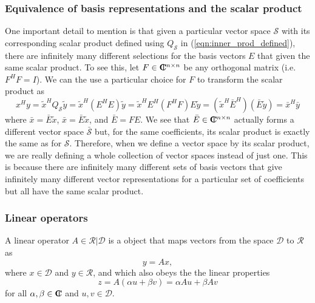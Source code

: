 \subsubsection{Equivalence of basis representations and the scalar product}

One important detail to mention is that given a particular vector space
$\mathcal{S}$ with its corresponding scalar product defined using
$Q_{\mathcal{S}}$ in (\ref{eqn:inner_prod_defined}), there are infinitely many
different selections for the basis vectors $E$ that given the same scalar
product.  To see this, let $F\in\mbox{\textbf{C}}\hspace{-1.1ex}\mbox{l}\hspace{0.4ex}^{n\times{}n}$ be any orthogonal matrix
(i.e.\ $F^H F = I$).  We can the use a particular choice for $F$ to transform
the scalar product as
%
\begin{equation}
x^H y = \tilde{x}^H Q_{\mathcal{S}} \tilde{y}
= \tilde{x}^H ( E^H E ) \tilde{y}
= \tilde{x}^H E^H ( F^H F ) E \tilde{y}
= ( \tilde{x}^H \bar{E}^H ) ( \bar{E} \tilde{y} )
= \bar{x}^H \bar{y}
\label{eqn:inner_x_y_F_E_prod}
\end{equation}
%
where $\bar{x} = {}\bar{E} {}\tilde{x}$, $\bar{x} = {}\bar{E} {}\tilde{x}$,
and $\bar{E} = F E$.  We see that $\bar{E}\in\mbox{\textbf{C}}\hspace{-1.1ex}\mbox{l}\hspace{0.4ex}^{n\times{}n}$ actually forms
a different vector space $\bar{\mathcal{S}}$ but, for the same coefficients,
its scalar product is exactly the same as for $\mathcal{S}$.  Therefore, when
we define a vector space by its scalar product, we are really defining a whole
collection of vector spaces instead of just one.  This is because there are
infinitely many different sets of basis vectors that give infinitely many
different vector representations for a particular set of coefficients but all
have the same scalar product.

\subsubsection{Linear operators}

A linear operator $A\in\mathcal{R}|\mathcal{D}$ is a object that maps vectors
from the space $\mathcal{D}$ to $\mathcal{R}$ as
%
\begin{equation}
y = A x,
\label{eqn:fwd_op_apply}
\end{equation}
%
where $x\in\mathcal{D}$ and $y\in\mathcal{R}$, and which also obeys the the
linear properties
%
\begin{equation}
z = A(\alpha u + \beta v) = \alpha A u + \beta A v
\label{eqn:linear_op_properties}
\end{equation}
%
for all $\alpha,\beta\in\mbox{\textbf{C}}\hspace{-1.1ex}\mbox{l}\hspace{0.4ex}$ and $u,v\in\mathcal{D}$.

